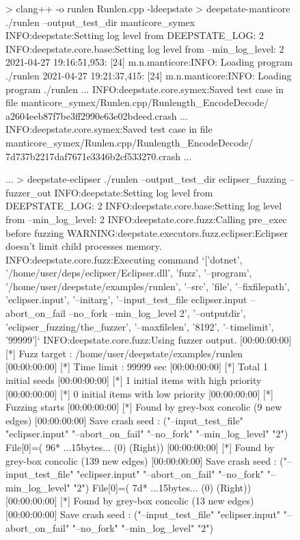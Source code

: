 \documentclass[sigconf]{acmart}
\begin{document}
\begin{figure}
  {\scriptsize
\begin{code}
> clang++ -o runlen Runlen.cpp -ldeepstate
> deepstate-manticore ./runlen --output\_test\_dir manticore\_symex
INFO:deepstate:Setting log level from DEEPSTATE\_LOG: 2
INFO:deepstate.core.base:Setting log level from --min\_log\_level: 2
2021-04-27 19:16:51,953: [24] m.n.manticore:INFO: Loading program ./runlen
2021-04-27 19:21:37,415: [24] m.n.manticore:INFO: Loading program ./runlen
...
INFO:deepstate.core.symex:Saved test case in file
manticore\_symex/Runlen.cpp/Runlength\_EncodeDecode/
a2604eeb87f7be3ff2990e63e02bdeed.crash
...
INFO:deepstate.core.symex:Saved test case in file
manticore\_symex/Runlen.cpp/Runlength\_EncodeDecode/
7d737b2217daf7671e3346b2cf533270.crash
...

...
> deepstate-eclipser ./runlen --output\_test\_dir eclipser\_fuzzing --fuzzer\_out
INFO:deepstate:Setting log level from DEEPSTATE\_LOG: 2
INFO:deepstate.core.base:Setting log level from --min\_log\_level: 2
INFO:deepstate.core.fuzz:Calling pre\_exec before fuzzing
WARNING:deepstate.executors.fuzz.eclipser:Eclipser doesn't limit child
processes memory.
INFO:deepstate.core.fuzz:Executing command
`['dotnet', '/home/user/deps/eclipser/Eclipser.dll', 'fuzz', '--program',
'/home/user/deepstate/examples/runlen', '--src', 'file', '--fixfilepath',
  'eclipser.input', '--initarg', '--input\_test\_file eclipser.input
  --abort\_on\_fail --no\_fork --min\_log\_level 2', '--outputdir',
  'eclipser\_fuzzing/the\_fuzzer', '--maxfilelen', '8192', '--timelimit',
  '99999']`
INFO:deepstate.core.fuzz:Using fuzzer output.
[00:00:00:00] [*] Fuzz target : /home/user/deepstate/examples/runlen
[00:00:00:00] [*] Time limit : 99999 sec
[00:00:00:00] [*] Total 1 initial seeds
[00:00:00:00] [*] 1 initial items with high priority
[00:00:00:00] [*] 0 initial items with low priority
[00:00:00:00] [*] Fuzzing starts
[00:00:00:00] [*] Found by grey-box concolic (9 new edges) 
[00:00:00:00] Save crash seed : ("--input\_test\_file" "eclipser.input"
  "--abort\_on\_fail" "--no\_fork" "--min\_log\_level" "2")
  File[0]=( 96* ...15bytes... (0) (Right))
[00:00:00:00] [*] Found by grey-box concolic (139 new edges) 
[00:00:00:00] Save crash seed : ("--input\_test\_file" "eclipser.input"
  "--abort\_on\_fail" "--no\_fork" "--min\_log\_level" "2")
  File[0]=( 7d* ...15bytes... (0) (Right))
[00:00:00:00] [*] Found by grey-box concolic (13 new edges) 
[00:00:00:00] Save crash seed : ("--input\_test\_file" "eclipser.input"
  "--abort\_on\_fail" "--no\_fork" "--min\_log\_level" "2")

\end{code}}
\end{figure}
\end{document}
